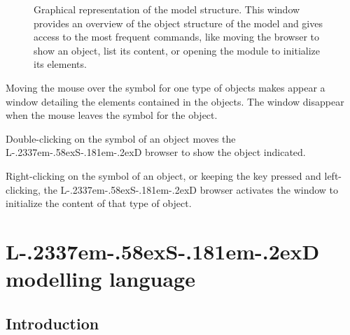\documentclass [11pt,a4paper] {book}
\def\LsD{{L\kern-.2337em\lower-.58ex\hbox{S}\kern-.181em\lower-.2ex\hbox{D}}\xspace}
\begin{document}
\begin{figure}[ht]
  \centering
  \caption{\small Graphical representation of the model structure. This window provides an overview of the object structure of the model and gives access to the most frequent commands, like moving the browser to show an object, list its content, or opening the module to initialize its elements.}
   \label{fig:model_structure}
\end{figure}

Moving the mouse over the symbol for one type of objects makes appear a window detailing the elements contained in the objects. The window disappear when the mouse leaves the symbol for the object.

Double-clicking on the symbol of an object moves the \LsD browser to show the object indicated.

Right-clicking on the symbol of an object, or keeping the key  pressed and left-clicking, the \LsD browser activates the window to initialize the content of that type of object.




















\section{\LsD modelling language }\label{sec:lan}

\subsection{Introduction}
\end{document}
